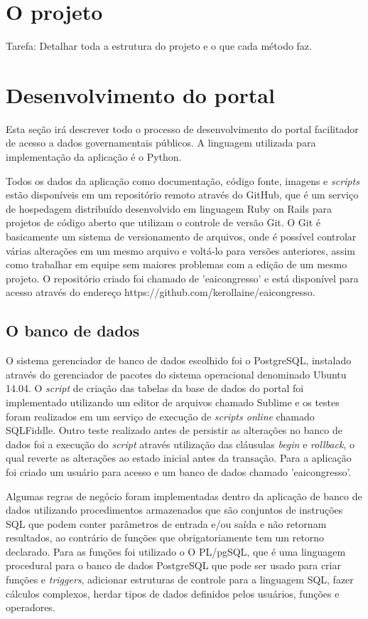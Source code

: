 \documentclass[
	12pt,				%
	openright,			%
	twoside,			%
	a4paper,			%
	english,			%
	french,				%
	spanish,			%
	brazil				%
	]{abntex2}
\begin{document}
\chapter{O projeto}
Tarefa: Detalhar toda a estrutura do projeto e o que cada método faz.

\chapter{Desenvolvimento do portal}
Esta seção irá descrever todo o processo de desenvolvimento do portal facilitador de acesso a dados governamentais públicos. A linguagem utilizada para implementação 
da aplicação é o Python.

Todos os dados da aplicação como documentação, código fonte, imagens e \emph{scripts} estão disponíveis em 
um repositório remoto através do GitHub, que é um serviço de hospedagem distribuído desenvolvido em linguagem Ruby on Rails para projetos de código aberto que
utilizam o controle de versão Git. O Git é basicamente um sistema de versionamento de arquivos, onde é possível controlar várias alterações em um mesmo arquivo e voltá-lo para versões anteriores, assim como trabalhar em equipe sem maiores 
problemas com a edição de um mesmo projeto.
O repositório criado foi chamado de 'eaicongresso' e está disponível para acesso através do endereço https://github.com/kerollaine/eaicongresso.

\section{O banco de dados}
O sistema gerenciador de banco de dados escolhido foi o PostgreSQL, instalado através do gerenciador de pacotes do sistema operacional denominado Ubuntu 14.04.
O \emph{script} de criação das tabelas da base de dados do portal foi implementado utilizando um editor de arquivos chamado Sublime e os testes foram realizados em um serviço
de execução de \emph{scripts online} chamado SQLFiddle. Outro teste realizado antes de persistir as alterações no banco de dados foi a execução do \emph{script} através utilização das cláusulas \emph{begin} e \emph{rollback}, o qual reverte as alterações ao estado inicial antes da transação. Para 
a aplicação foi criado um usuário para acesso e um banco de dados chamado 'eaicongresso'.

Algumas regras de negócio foram implementadas dentro da aplicação de banco de dados utilizando procedimentos armazenados que são conjuntos
de instruções SQL que podem conter parâmetros de entrada e/ou saída e não retornam resultados, ao contrário de funções que 
obrigatoriamente tem um retorno declarado. Para as funções foi utilizado o O PL/pgSQL, que é uma linguagem procedural para o banco de 
dados PostgreSQL que pode ser usado para criar funções e \emph{triggers}, adicionar estruturas de controle para a 
linguagem SQL, fazer cálculos complexos, herdar tipos de dados definidos pelos usuários, funções e operadores.
\end{document}
